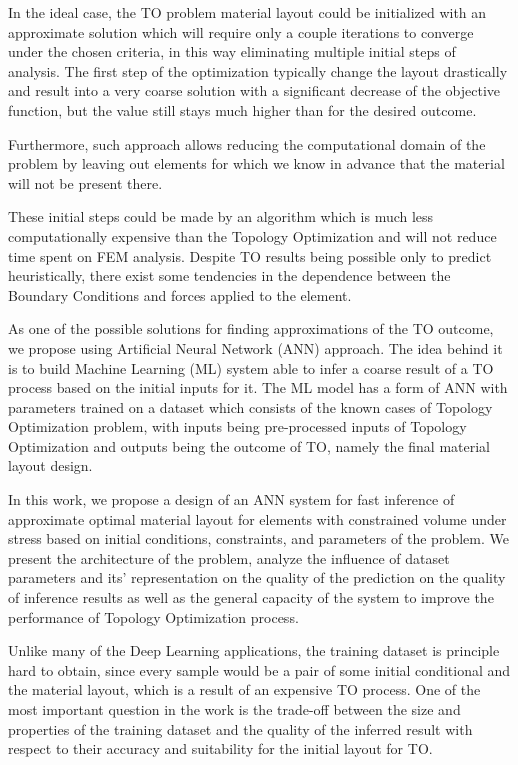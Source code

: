 \medskip
In the ideal case, the TO problem material layout could be initialized with an approximate solution which will require only a couple iterations to converge under the chosen criteria, in this way eliminating multiple initial steps of analysis.
The first step of the optimization typically change the layout drastically and result into a very coarse solution with a significant decrease of the objective function, but the value still stays much higher than for the desired outcome. 
\medskip

Furthermore, such approach allows reducing the computational domain of the problem by leaving out elements for which we know in advance that the material will not be present there. 
\medskip
{}

These initial steps could be made by an algorithm which is much less computationally expensive than the Topology Optimization and will not reduce time spent on FEM analysis. 
Despite TO results being possible only to predict heuristically, there exist some tendencies in the dependence between the Boundary Conditions and forces applied to the element. 
\medskip

As one of the possible solutions for finding approximations of the TO outcome, we propose using Artificial Neural Network (ANN) approach.
The idea behind it is to build Machine Learning (ML) system able to infer a coarse result of a TO process based on the initial inputs for it.
The ML model has a form of ANN with parameters trained on a dataset which consists of the known cases of Topology Optimization problem, with inputs being pre-processed inputs of Topology Optimization and outputs being the outcome of TO, namely the final material layout design.
\medskip

In this work, we propose a design of an ANN system for fast inference of approximate optimal material layout for elements with constrained volume under stress based on initial conditions, constraints, and parameters of the problem. 
We present the architecture of the problem, analyze the influence of dataset parameters and its' representation on the quality of the prediction on the quality of inference results as well as the general capacity of the system to improve the performance of Topology Optimization process.  
\medskip

Unlike many of the Deep Learning applications, the training dataset is principle hard to obtain, since every sample would be a pair of some initial conditional and the material layout, which is a result of an expensive TO process. 
One of the most important question in the work is the trade-off between the size and properties of the training dataset and the quality of the inferred result with respect to their accuracy and suitability for the initial layout for TO.


